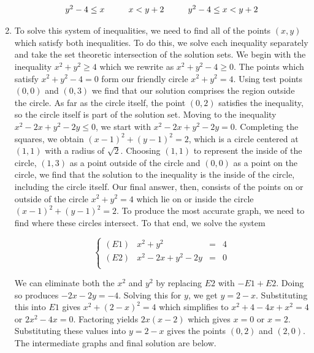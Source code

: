 \begin{ex}
\begin{enumerate}
\[\begin{array}{ccc}
y^2 - 4 \leq x & \hspace{.25in}  x < y+2 & \hspace{.25in} y^2 - 4 \leq x < y+2 \\

\end{array} \]

\item  To solve this system of inequalities, we need to find all of the points $(x,y)$ which satisfy both inequalities.  To do this, we solve each inequality separately and take the set theoretic intersection of the solution sets.  We begin with the inequality $x^2 + y^2 \geq 4$ which we rewrite as $x^2+y^2 - 4 \geq 0$.  The points which satisfy $x^2 + y^2 - 4 = 0$ form our friendly circle $x^2+y^2 = 4$.   Using test points $(0,0)$ and $(0,3)$ we find that our solution comprises the region outside the circle.  As far as the circle itself, the point $(0,2)$ satisfies the inequality, so the circle itself is part of the solution set.  Moving to the inequality $x^2 - 2x + y^2 - 2y \leq 0$, we start with $x^2 - 2x + y^2 - 2y = 0$.  Completing the squares, we obtain $(x-1)^2 + (y-1)^2 = 2$, which is a circle centered at $(1,1)$ with a radius of $\sqrt{2}$.  Choosing $(1,1)$ to represent the inside of the circle, $(1,3)$ as a point outside of the circle and $(0,0)$ as a point on the circle, we find that the solution to the inequality is the inside of the circle, including the circle itself.  Our final answer, then, consists of the points on or outside of the circle $x^2 + y^2 = 4$ which lie on or inside the circle $(x-1)^2+(y-1)^2 = 2$.  To produce the most accurate graph, we need to find where these circles intersect.  To that end, we solve the system

\[\left\{\begin{array}{lrcr}  (E1) & x^2 + y^2 & = & 4 \\ (E2) & x^2 - 2x + y^2 - 2y & = & 0 \\ \end{array} \right.\]

We can eliminate both the $x^2$ and $y^2$ by replacing $E2$ with $-E1 + E2$.  Doing so produces $-2x - 2y = -4$.  Solving this for $y$, we get $y = 2-x$.  Substituting this into $E1$ gives $x^2 + (2-x)^2 = 4$ which simplifies to $x^2 + 4-4x+x^2 = 4$ or $2x^2 - 4x = 0$.  Factoring yields $2x(x-2)$ which gives $x=0$ or $x=2$.  Substituting these values into $y=2-x$ gives the points $(0,2)$ and $(2,0)$.  The intermediate graphs and final solution are below.



\end{enumerate}
\end{ex}
